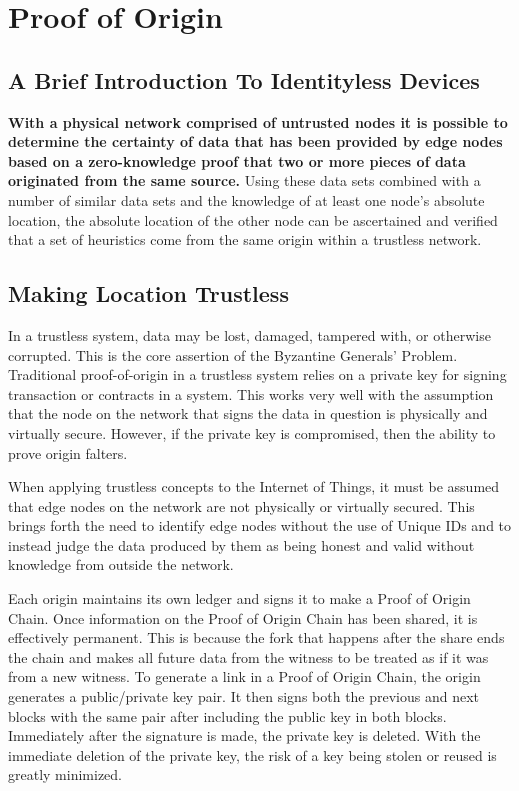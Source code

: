 \documentclass{article}
\begin{document}
\section {Proof of Origin}

\subsection {A Brief Introduction To Identityless Devices}
\textbf{With a physical network comprised of untrusted nodes it is possible to determine the \gls{certainty} of data that has been provided by edge nodes based on a zero-knowledge proof that two or more pieces of data originated from the same source.} Using these data sets combined with a number of similar data sets and the knowledge of at least one node's absolute location, the absolute location of the other node can be ascertained and verified that a set of \glspl{heuristic} come from the same origin within a trustless network.

\subsection {Making Location Trustless}
In a trustless system, data may be lost, damaged, tampered with, or otherwise corrupted. This is the core assertion of the Byzantine Generals' Problem. Traditional \Gls{proof-of-origin} in a trustless system relies on a private key for signing transaction or contracts in a system. This works very well with the assumption that the node on the network that signs the data in question is physically and virtually secure. However, if the private key is compromised, then the ability to prove origin falters.

When applying trustless concepts to the Internet of Things, it must be assumed that edge nodes on the network are not physically or virtually secured. This brings forth the need to identify edge nodes without the use of Unique IDs and to instead judge the data produced by them as being honest and valid without knowledge from outside the network.

Each origin maintains its own ledger and signs it to make a Proof of Origin Chain. Once information on the Proof of Origin Chain has been shared, it is effectively permanent. This is because the fork that happens after the share ends the chain and makes all future data from the witness to be treated as if it was from a new witness. To generate a link in a Proof of Origin Chain, the origin generates a public/private key pair. It then signs both the previous and next blocks with the same pair after including the public key in both blocks. Immediately after the signature is made, the private key is deleted. With the immediate deletion of the private key, the risk of a key being stolen or reused is greatly minimized.
\end{document}
